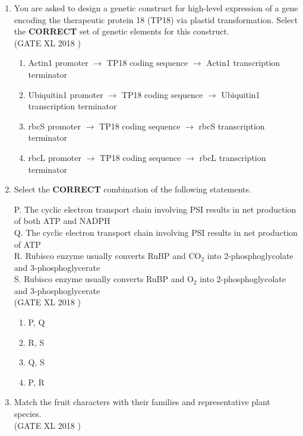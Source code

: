 \documentclass[14pt]{extarticle}
\begin{document}
\begin{flushleft}
\begin{enumerate}[leftmargin=*]
    \item You are asked to design a genetic construct for high-level expression of a gene encoding the therapeutic protein 18 (TP18) via plastid transformation. Select the \textbf{CORRECT} set of genetic elements for this construct.\\
 \hfill(GATE XL 2018 )   
    \begin{enumerate}[label=(\Alph*)]
        \item Actin1 promoter $\rightarrow$ TP18 coding sequence $\rightarrow$ Actin1 transcription terminator
        \item Ubiquitin1 promoter $\rightarrow$ TP18 coding sequence $\rightarrow$ Ubiquitin1 transcription terminator
        \item rbcS promoter $\rightarrow$ TP18 coding sequence $\rightarrow$ rbcS transcription terminator
        \item rbcL promoter $\rightarrow$ TP18 coding sequence $\rightarrow$ rbcL transcription terminator
    \end{enumerate}
    

    \item Select the \textbf{CORRECT} combination of the following statements.  

    P. The cyclic electron transport chain involving PSI results in net production of both ATP and NADPH \\
    Q. The cyclic electron transport chain involving PSI results in net production of ATP \\
    R. Rubisco enzyme usually converts RuBP and CO$_2$ into 2-phosphoglycolate and 3-phosphoglycerate \\
    S. Rubisco enzyme usually converts RuBP and O$_2$ into 2-phosphoglycolate and 3-phosphoglycerate\\
    \hfill(GATE XL 2018 )
    \begin{multicols}{2}
    \begin{enumerate}[label=(\Alph*)]
        \item P, Q
        \item R, S
        \item Q, S
        \item P, R
    \end{enumerate}
    \end{multicols}

\item Match the fruit characters with their families and representative plant species.\\
\hfill(GATE XL 2018 )


\end{enumerate}
\end{flushleft}
\end{document}
